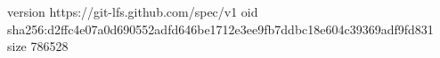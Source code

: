 version https://git-lfs.github.com/spec/v1
oid sha256:d2ffc4e07a0d690552adfd646be1712e3ee9fb7ddbc18e604c39369adf9fd831
size 786528
